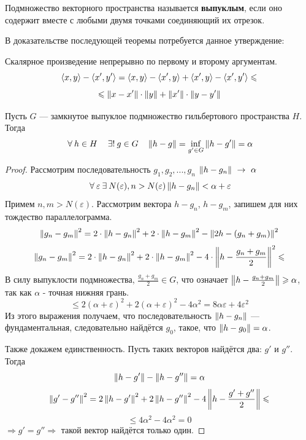 \documentclass[12pt]{article}
\begin{document}
	\begin{defi}
		Подмножество векторного пространства называется \textbf{выпуклым}, если оно содержит вместе с любыми двумя 
		точками соединяющий их отрезок.
	\end{defi}

	В доказательстве последующей теоремы потребуется данное утверждение:
	\begin{state}
		Скалярное произведение непрерывно по первому и второму аргументам.
		$$\left\langle x, y \right\rangle - \left\langle x', y' \right\rangle = \left\langle x, y \right\rangle - \left\langle x', y \right\rangle + \left\langle x', y \right\rangle - \left\langle x', y' \right\rangle \leqslant$$
		$$\leqslant \left\| x - x' \right\|\cdot \left\| y \right\| + \left\| x' \right\| \cdot \left\| y - y' \right\|$$
	\end{state}
	
	\begin{theorem}
		Пусть $G$ --- замкнутое выпуклое подмножество гильбертового пространства $H$. Тогда
		$$\forall h \in H \quad \existsonly g \in G \quad \norm{h-g} = \underset{g' \in G}{\inf} \norm{h-g'} = \alpha$$
	\end{theorem}
	\begin{proof}
		Рассмотрим последовательность $g_1, g_2, ..., g_n$ $\left\| h - g_n \right\|~\rightarrow~\alpha$
		$$\forall \varepsilon \exists N(\varepsilon), n > N(\varepsilon) \norm{h - g_n} < \alpha + \varepsilon$$
		Примем $n, m > N(\varepsilon)$. Рассмотрим вектора $h - g_n$, $h - g_m$, запишем для них тождество параллелограмма.
		$$\left\| g_n - g_m \right\|^2 = 2 \cdot \left\| h - g_n \right\|^2 + 2 \cdot \left\| h - g_m \right\|^2 - \left\| 2h - (g_n + g_m) \right\|^2$$
		$$\left\| g_n - g_m \right\|^2 = 2 \cdot \left\| h - g_n \right\|^2 + 2 \cdot \left\| h - g_m \right\|^2 - 4 \cdot \left\| h - \frac{g_n + g_m}{2} \right\|^2 \leqslant$$
		В силу выпуклости подмножества, $\frac{g_n + g_m}{2} \in G$, что означает $\left\| h - \frac{g_n + g_m}{2} \right\| \geqslant \alpha$, так
		как $\alpha$ - точная нижняя грань.
		$$\leq 2 (\alpha + \varepsilon)^2 + 2 (\alpha + \varepsilon)^2 - 4 \alpha^2 = 8 \alpha \varepsilon + 4 \varepsilon^2$$
		Из этого выражения получаем, что последовательность $\left\| h - g_n \right\|$ --- фундаментальная, следовательно найдётся $g_0$, такое,
		что $\left\| h - g_0 \right\| = \alpha$.
		
		Также докажем единственность. Пусть таких векторов найдётся два: $g'$ и $g''$. Тогда
		$$\left\| h - g' \right\| - \left\| h - g'' \right\| = \alpha$$
		$$\left\| g' - g'' \right\|^2 = 2 \left\| h - g' \right\|^2 + 2 \left\| h - g'' \right\|^2 - 4 \left\| h - \frac{g' + g''}{2} \right\| \leqslant$$
		$$\leq 4 \alpha^2 - 4 \alpha^2 = 0$$
		$\Rightarrow g' = g'' \Rightarrow$ такой вектор найдётся только один.
	\end{proof}
	
\end{document}
